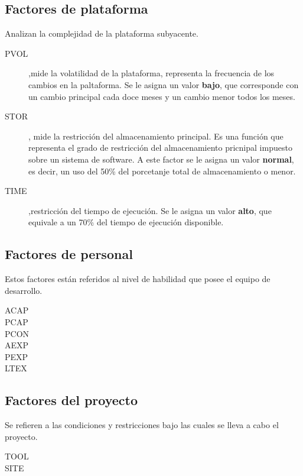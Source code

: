 \documentclass[11pt,a4paper,spanish,twoside]{book}
\begin{document}
\subsection{Factores de plataforma}
Analizan la complejidad de la plataforma subyacente.
\begin{description}
\item[PVOL],mide la volatilidad de la plataforma, representa la frecuencia de
  los cambios en la paltaforma. Se le asigna un valor \textbf{bajo}, que
  corresponde con un cambio principal cada doce meses y un cambio menor todos
  los meses.

\item[STOR], mide la restricción del almacenamiento principal. Es una función
  que representa el grado de restricción del almacenamiento pricnipal
  impuesto sobre un sistema de software. A este factor se le asigna un valor
  \textbf{normal}, es decir, un uso del 50\% del porcetanje total de
  almacenamiento o menor.

\item[TIME],restricción del tiempo de ejecución. Se le asigna un valor
  \textbf{alto}, que equivale a un 70\% del tiempo de ejecución disponible.
\end{description}


\subsection{Factores de personal}
Estos factores están referidos al nivel de habilidad que posee el equipo de
desarrollo.
\begin{description}
\item[ACAP]
\item[PCAP]
\item[PCON]
\item[AEXP]
\item[PEXP]
\item[LTEX]
\end{description}

\subsection{Factores del proyecto}
Se refieren a las condiciones y restricciones bajo las cuales se lleva a cabo
el proyecto.
\begin{description}
\item[TOOL]
\item[SITE]
\end{description}
\end{document}

